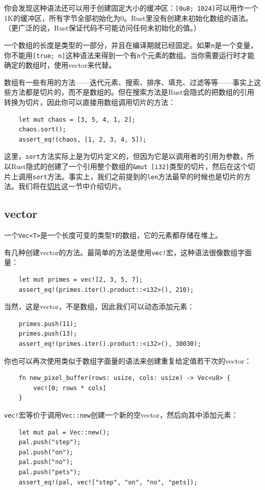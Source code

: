 你会发现这种语法还可以用于创建固定大小的缓冲区：\texttt{[0u8; 1024]}可以用作一个1K的缓冲区，所有字节全部初始化为0。Rust里没有创建未初始化数组的语法。（更广泛的说，Rust保证代码不可能访问任何未初始化的值。）

一个数组的长度是类型的一部分，并且在编译期就已经固定。如果\texttt{n}是一个变量，你不能用\texttt{[true; n]}这种语法来得到一个有\texttt{n}个元素的数组。当你需要运行时才能确定的数组时，使用vector来代替。

数组有一些有用的方法——迭代元素、搜索、排序、填充、过滤等等——事实上这些方法都是切片的，而不是数组的。但在搜索方法是Rust会隐式的把数组的引用转换为切片，因此你可以直接用数组调用切片的方法：
\begin{verbatim}
    let mut chaos = [3, 5, 4, 1, 2];
    chaos.sort();
    assert_eq!(chaos, [1, 2, 3, 4, 5]);
\end{verbatim}

这里，\texttt{sort}方法实际上是为切片定义的，但因为它是以调用者的引用为参数，所以Rust隐式的创建了一个引用整个数组的\texttt{\&mut [i32]}类型的切片，然后在这个切片上调用\texttt{sort}方法。事实上，我们之前提到的\texttt{len}方法最早的时候也是切片的方法。我们将在\hyperref[slice]{切片}这一节中介绍切片。

\subsection{vector}

一个\texttt{Vec<T>}是一个长度可变的类型\texttt{T}的数组，它的元素都存储在堆上。

有几种创建vector的方法。最简单的方法是使用\texttt{vec!}宏，这种语法很像数组字面量：
\begin{verbatim}
    let mut primes = vec![2, 3, 5, 7];
    assert_eq!(primes.iter().product::<i32>(), 210);
\end{verbatim}
当然，这是vector，不是数组，因此我们可以动态添加元素：
\begin{verbatim}
    primes.push(11);
    primes.push(13);
    assert_eq!(primes.iter().product::<i32>(), 30030);
\end{verbatim}

你也可以再次使用类似于数组字面量的语法来创建重复给定值若干次的vector：
\begin{verbatim}
    fn new_pixel_buffer(rows: usize, cols: usize) -> Vec<u8> {
        vec![0; rows * cols]
    }
\end{verbatim}
\texttt{vec!}宏等价于调用\texttt{Vec::new}创建一个新的空vector，然后向其中添加元素：
\begin{verbatim}
    let mut pal = Vec::new();
    pal.push("step");
    pal.push("on");
    pal.push("no");
    pal.push("pets");
    assert_eq!(pal, vec!["step", "on", "no", "pets]);
\end{verbatim}

